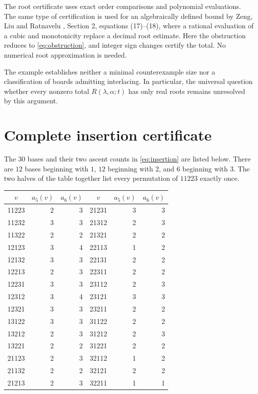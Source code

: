 \documentclass[11pt]{article}
\begin{document}
The root certificate uses exact order comparisons and polynomial
evaluations. The same type of certification is used for an algebraically
defined bound by Zeng, Liu and Ratnavelu
\cite{ZengLiuRatnavelu2026}, Section 2, equations (17)--(18), where a
rational evaluation of a cubic and monotonicity replace a decimal root
estimate. Here the obstruction reduces to \eqref{eq:obstruction}, and
integer sign changes certify the total. No numerical root approximation
is needed.

The example establishes neither a minimal counterexample size nor a
classification of boards admitting interlacing. In particular, the
universal question whether every nonzero total
$R(\lambda,\alpha;t)$ has only real roots remains unresolved by this
argument.

\appendix
\section{Complete insertion certificate}\label{app:certificate}

The $30$ bases and their two ascent counts in \eqref{eq:insertion} are
listed below. There are $12$ bases beginning with $1$, $12$ beginning
with $2$, and $6$ beginning with $3$. The two halves of the table together
list every permutation of $11223$ exactly once.

\begin{center}
\begin{tabular}{crr@{\qquad\qquad}crr}
\toprule
$v$ & $a_5(v)$ & $a_6(v)$ & $v$ & $a_5(v)$ & $a_6(v)$\\
\midrule
11223 & 2 & 3 & 21231 & 3 & 3\\
11232 & 3 & 3 & 21312 & 2 & 3\\
11322 & 2 & 2 & 21321 & 2 & 2\\
12123 & 3 & 4 & 22113 & 1 & 2\\
12132 & 3 & 3 & 22131 & 2 & 2\\
12213 & 2 & 3 & 22311 & 2 & 2\\
12231 & 3 & 3 & 23112 & 2 & 3\\
12312 & 3 & 4 & 23121 & 3 & 3\\
12321 & 3 & 3 & 23211 & 2 & 2\\
13122 & 3 & 3 & 31122 & 2 & 2\\
13212 & 2 & 3 & 31212 & 2 & 3\\
13221 & 2 & 2 & 31221 & 2 & 2\\
21123 & 2 & 3 & 32112 & 1 & 2\\
21132 & 2 & 2 & 32121 & 2 & 2\\
21213 & 2 & 3 & 32211 & 1 & 1\\
\bottomrule
\end{tabular}
\end{center}
\end{document}
